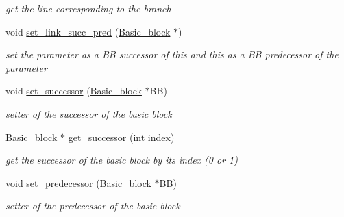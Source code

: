 \begin{DoxyCompactItemize}
\begin{DoxyCompactList}\small\item\em get the line corresponding to the branch \end{DoxyCompactList}\item 
\mbox{\label{class_basic__block_acb9b80088751bcf4329b3d1532f724ac}} 
void \mbox{\hyperlink{class_basic__block_acb9b80088751bcf4329b3d1532f724ac}{set\+\_\+link\+\_\+succ\+\_\+pred}} (\mbox{\hyperlink{class_basic__block}{Basic\+\_\+block}} $\ast$)
\begin{DoxyCompactList}\small\item\em set the parameter as a BB successor of this and this as a BB predecessor of the parameter \end{DoxyCompactList}\item 
\mbox{\label{class_basic__block_a9ec82d32525f886034ab8021a79974b1}} 
void \mbox{\hyperlink{class_basic__block_a9ec82d32525f886034ab8021a79974b1}{set\+\_\+successor}} (\mbox{\hyperlink{class_basic__block}{Basic\+\_\+block}} $\ast$BB)
\begin{DoxyCompactList}\small\item\em setter of the successor of the basic block \end{DoxyCompactList}\item 
\mbox{\label{class_basic__block_a48d340402753b51badac5360edcd184f}} 
\mbox{\hyperlink{class_basic__block}{Basic\+\_\+block}} $\ast$ \mbox{\hyperlink{class_basic__block_a48d340402753b51badac5360edcd184f}{get\+\_\+successor}} (int index)
\begin{DoxyCompactList}\small\item\em get the successor of the basic block by its index (0 or 1) \end{DoxyCompactList}\item 
\mbox{\label{class_basic__block_a9ca33ccefa6395a6b0b876af20a57eaa}} 
void \mbox{\hyperlink{class_basic__block_a9ca33ccefa6395a6b0b876af20a57eaa}{set\+\_\+predecessor}} (\mbox{\hyperlink{class_basic__block}{Basic\+\_\+block}} $\ast$BB)
\begin{DoxyCompactList}\small\item\em setter of the predecessor of the basic block \end{DoxyCompactList}\item 

\end{DoxyCompactItemize}

